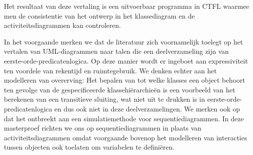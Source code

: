Het resultaat van deze vertaling is een uitvoerbaar programma in CTFL waarmee men de consistentie van het ontwerp in het klassediagram en de activiteitsdiagrammen kan controleren.

\parbreak

In het voorgaande merken we dat de literatuur zich voornamelijk toelegt op het vertalen van UML-diagrammen naar talen die een deelverzameling zijn van eerste-orde-predicatenlogica. Op deze manier wordt er ingeboet aan expressiviteit ten voordele van rekentijd en ruimtegebruik. We denken echter aan het modelleren van overerving: Het bepalen van tot welke klasses een object behoort ten gevolge van de gespecificeerde klassehi\"erarchie\"en is een voorbeeld van het berekenen van een transitieve sluiting, wat niet uit te drukken is in eerste-orde-predicatenlogica en dus ook niet in deze deelverzamelingen. We merken ook op dat het ontbreekt aan een simulatiemethode voor sequentiediagrammen. In deze masterproef richten we ons op sequentiediagrammen in plaats van activiteitsdiagrammen omdat voorgaande bovenop het modelleren van interacties tussen objecten ook toelaten om variabelen te defini\"eren.